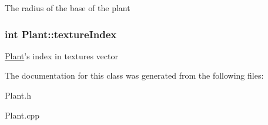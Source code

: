 The radius of the base of the plant \hypertarget{class_plant_aeaaf035b21354b12a272f66db178f5cb}{
\subsubsection[{texture\+Index}]{\setlength{\rightskip}{0pt plus 5cm}int Plant\+::texture\+Index\hspace{0.3cm}{\ttfamily [protected]}}}\label{class_plant_aeaaf035b21354b12a272f66db178f5cb}
\hyperlink{class_plant}{Plant}'s index in textures vector 

The documentation for this class was generated from the following files\+:\begin{DoxyCompactItemize}
\item 
Plant.\+h\item 
Plant.\+cpp\end{DoxyCompactItemize}
